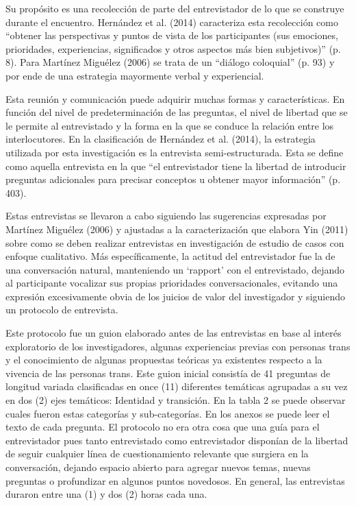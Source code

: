Su propósito es una recolección de parte del entrevistador de lo que se construye
durante el encuentro. Hernández et al. (2014) caracteriza esta recolección como
“obtener las perspectivas y puntos de vista de los participantes (sus emociones,
prioridades, experiencias, significados y otros aspectos más bien subjetivos)”
(p. 8).
Para Martínez Miguélez (2006) se trata de un “diálogo coloquial” (p. 93) y por
ende de una estrategia mayormente verbal y experiencial.

Esta reunión y comunicación puede adquirir muchas formas y características.
En función del nivel de predeterminación de las preguntas, el nivel de libertad
que se le permite al entrevistado y la forma en la que se conduce la relación
entre los interlocutores.
En la clasificación de Hernández et al. (2014), la estrategia utilizada por
esta investigación es la entrevista semi-estructurada.
Esta se define como aquella entrevista en la que “el entrevistador tiene la
libertad de introducir preguntas adicionales para precisar conceptos u obtener
mayor información” (p. 403).

Estas entrevistas se llevaron a cabo siguiendo las sugerencias expresadas por
Martínez Miguélez (2006) y ajustadas a la caracterización que elabora Yin (2011)
sobre como se deben realizar entrevistas en investigación de estudio de casos
con enfoque cualitativo.
Más específicamente, la actitud del entrevistador fue la de una conversación
natural, manteniendo un ‘rapport’ con el entrevistado, dejando al participante
vocalizar sus propias prioridades conversacionales, evitando una expresión
excesivamente obvia de los juicios de valor del investigador y siguiendo un
protocolo de entrevista.

Este protocolo fue un guion elaborado antes de las entrevistas en base al
interés exploratorio de los investigadores, algunas experiencias previas con
personas trans y el conocimiento de algunas propuestas teóricas ya existentes
respecto a la vivencia de las personas trans.
Este guion inicial consistía de 41 preguntas de longitud variada clasificadas en
once (11) diferentes temáticas agrupadas a su vez en dos (2) ejes temáticos:
Identidad y transición.
En la tabla 2 se puede observar cuales fueron estas categorías y sub-categorías.
En los anexos se puede leer el texto de cada pregunta.
El protocolo no era otra cosa que una guía para el entrevistador pues tanto
entrevistado como entrevistador disponían de la libertad de seguir cualquier
línea de cuestionamiento relevante que surgiera en la conversación, dejando
espacio abierto para agregar nuevos temas, nuevas preguntas o profundizar en
algunos puntos novedosos.
En general, las entrevistas duraron entre una (1) y dos (2) horas cada una.

